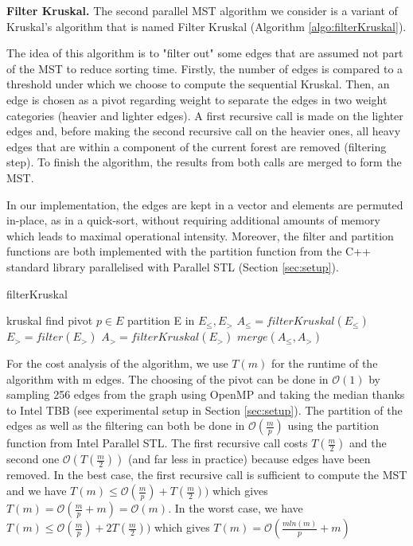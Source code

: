 \documentclass[letterpaper]{article}
\newcommand{\mypar}[1]{{\bf #1.}}
\begin{document}
\mypar{Filter Kruskal} The second parallel MST algorithm we consider is a variant of Kruskal's algorithm that is named Filter Kruskal (Algorithm \ref{algo:filterKruskal}).

The idea of this algorithm is to "filter out" some edges that are assumed not part of the MST to reduce sorting time.
Firstly, the number of edges is compared to a threshold under which we choose to compute the sequential Kruskal.
Then, an edge is chosen as a pivot regarding weight to separate the edges in two weight categories (heavier and lighter edges).
A first recursive call is made on the lighter edges and, before making the second recursive call on the heavier ones, all heavy edges that are within a component of the current forest are removed (filtering step).
To finish the algorithm, the results from both calls are merged to form the MST.

In our implementation, the edges are kept in a vector and elements are permuted in-place, as in a quick-sort, without requiring additional amounts of memory which leads to maximal operational intensity. Moreover, the filter and partition functions are both implemented with the partition function from the C++ standard library parallelised with Parallel STL (Section \ref{sec:setup}).

\begin{algorithm}
\caption{filterKruskal}
\label{algo:filterKruskal}
\begin{algorithmic}
    kruskal
\Else
    \State find pivot $p \in E$
    \State partition E in $E_{\leq}, E_{>}$
    \State $A_{\leq} = filterKruskal(E_{\leq})$
    \State $E_{>} = filter(E_{>})$
    \State $A_{>} = filterKruskal(E_{>})$
    \State \Return $merge(A_{\leq},  A_{>})$
\EndIf  
    
\end{algorithmic}
\end{algorithm}


For the cost analysis of the algorithm, we use $T(m)$ for the runtime of the algorithm with m edges. The choosing of the pivot can be done in $\mathcal{O}(1)$ by sampling 256 edges from the graph using OpenMP and taking the median thanks to Intel TBB (see experimental setup in Section \ref{sec:setup}).
The partition of the edges as well as the filtering can both be done in $\mathcal{O}(\frac{m}{p})$ using the partition function from Intel Parallel STL. The first recursive call costs $T(\frac{m}{2})$ and the second one $\mathcal{O}(T(\frac{m}{2}))$ (and far less in practice) because edges have been removed.
In the best case, the first recursive call is sufficient to compute the MST and we have $T(m) \leq  \mathcal{O}(\frac{m}{p}) + T(\frac{m}{2})) $ which gives $T(m) = \mathcal{O}(\frac{m}{p} + m) = \mathcal{O}(m)$.
In the worst case, we have $T(m) \leq  \mathcal{O}(\frac{m}{p}) + 2T(\frac{m}{2})) $ which gives $T(m) = \mathcal{O}(\frac{mln(m)}{p} + m)$
\end{document}
